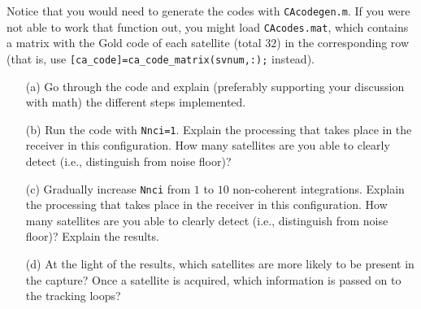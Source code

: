 \documentclass[11pt]{article}
\begin{document}
% 
%         
%     
% 
% 

Notice that you would need to generate the codes with \verb|CAcodegen.m|. If you were not able to work that function out, you might load \verb|CAcodes.mat|, which contains a matrix with the Gold code of each satellite (total $32$) in the corresponding row (that is, use \verb|[ca_code]=ca_code_matrix(svnum,:);| instead).


\begin{enumerate}
\item[(a)] Go through the code and explain (preferably supporting your discussion with math) the different steps implemented. 
\item[(b)] Run the code with \verb|Nnci=1|. Explain the processing that takes place in the receiver in this configuration. How many satellites are you able to clearly detect (i.e., distinguish from noise floor)? 
\item[(c)] Gradually increase \verb|Nnci| from $1$ to $10$ non-coherent integrations. Explain the processing that takes place in the receiver in this configuration. How many satellites are you able to clearly detect (i.e., distinguish from noise floor)? Explain the results. 
\item[(d)] At the light of the results, which satellites are more likely to be present in the capture? Once a satellite is acquired, which information is passed on to the tracking loops?
\end{enumerate}
\end{document}
